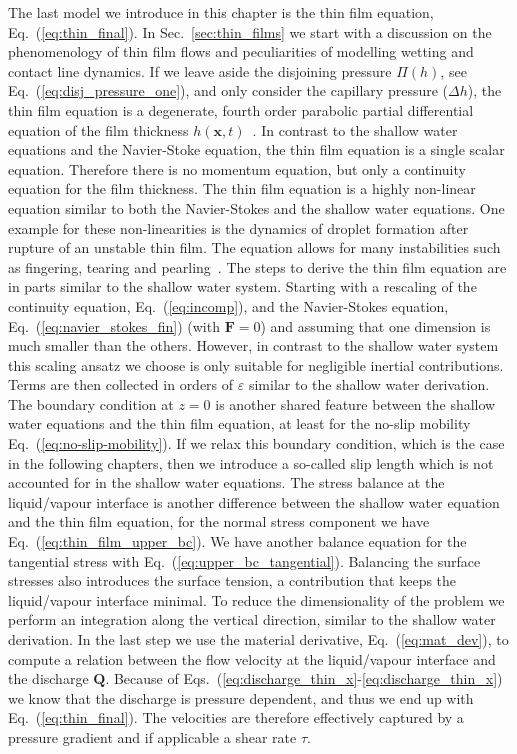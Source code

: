 The last model we introduce in this chapter is the thin film equation, Eq.~(\ref{eq:thin_final}). 
In Sec.~\ref{sec:thin_films} we start with a discussion on the phenomenology of thin film flows and peculiarities of modelling wetting and contact line dynamics.
If we leave aside the disjoining pressure $\Pi(h)$, see Eq.~(\ref{eq:disj_pressure_one}), and only consider the capillary pressure ($\Delta h$), the thin film equation is a degenerate, fourth order parabolic partial differential equation of the film thickness $h(\mathbf{x},t)$~\cite{peschkaVariationalApproachDynamic2018}.
In contrast to the shallow water equations and the Navier-Stoke equation, the thin film equation is a single scalar equation.
Therefore there is no momentum equation, but only a continuity equation for the film thickness.
The thin film equation is a highly non-linear equation similar to both the Navier-Stokes and the shallow water equations. 
One example for these non-linearities is the dynamics of droplet formation after rupture of an unstable thin film. 
The equation allows for many instabilities such as fingering, tearing and pearling~\cite{crasterDynamicsStabilityThin2009, wilczekSlidingDropsEnsemble2017}. 
The steps to derive the thin film equation are in parts similar to the shallow water system.
Starting with a rescaling of the continuity equation, Eq.~(\ref{eq:incomp}), and the Navier-Stokes equation, Eq.~(\ref{eq:navier_stokes_fin}) (with $\mathbf{F} = 0$) and assuming that one dimension is much smaller than the others. 
However, in contrast to the shallow water system this scaling ansatz we choose is only suitable for negligible inertial contributions.
Terms are then collected in orders of $\varepsilon$ similar to the shallow water derivation.
The boundary condition at $z=0$ is another shared feature between the shallow water equations and the thin film equation, at least for the no-slip mobility Eq.~(\ref{eq:no-slip-mobility}).
If we relax this boundary condition, which is the case in the following chapters, then we introduce a so-called slip length which is not accounted for in the shallow water equations.
The stress balance at the liquid/vapour interface is another difference between the shallow water equation and the thin film equation, for the normal stress component we have Eq.~(\ref{eq:thin_film_upper_bc}).
We have another balance equation for the tangential stress with Eq.~(\ref{eq:upper_bc_tangential}).
Balancing the surface stresses also introduces the surface tension, a contribution that keeps the liquid/vapour interface minimal.  
To reduce the dimensionality of the problem we perform an integration along the vertical direction, similar to the shallow water derivation.
In the last step we use the material derivative, Eq.~(\ref{eq:mat_dev}), to compute a relation between the flow velocity at the liquid/vapour interface and the discharge $\mathbf{Q}$.
Because of Eqs.~(\ref{eq:discharge_thin_x}-\ref{eq:discharge_thin_x}) we know that the discharge is pressure dependent, and thus we end up with Eq.~(\ref{eq:thin_final}).
The velocities are therefore effectively captured by a pressure gradient and if applicable a shear rate $\tau$.

